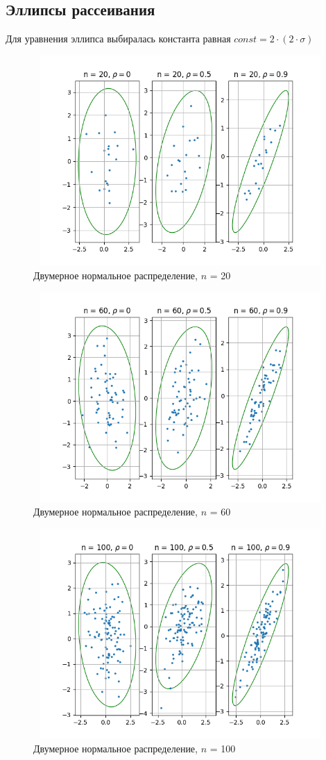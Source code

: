 \subsection{Эллипсы рассеивания}
\noindent Для уравнения эллипса выбиралась константа равная $const = 2 \cdot (2 \cdot \sigma)$

	\begin{figure}[H]
		\centering
		\includegraphics[width = 13cm, height = 8cm]{part_scattering_ellipse/figures/n_20}
		\caption{Двумерное нормальное распределение, $n$ = 20}
		\label{fig:n20}
	\end{figure}

	\begin{figure}[H]
		\centering
		\includegraphics[width = 13cm, height = 8cm]{part_scattering_ellipse/figures/n_60}
		\caption{Двумерное нормальное распределение, $n$ = 60}
		\label{fig:n60}
	\end{figure}

	\begin{figure}[H]
		\centering
		\includegraphics[width = 13cm, height = 8cm]{part_scattering_ellipse/figures/n_100}
		\caption{Двумерное нормальное распределение, $n$ = 100}
		\label{fig:n100}
	\end{figure}